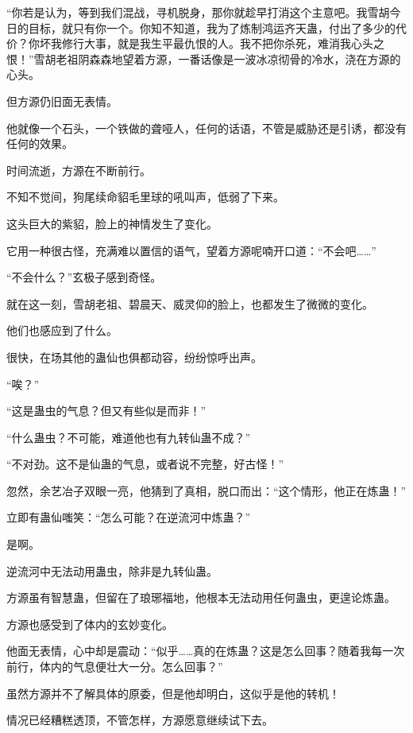 
\begin{this_body}

“你若是认为，等到我们混战，寻机脱身，那你就趁早打消这个主意吧。我雪胡今日的目标，就只有你一个。你知不知道，我为了炼制鸿运齐天蛊，付出了多少的代价？你坏我修行大事，就是我生平最仇恨的人。我不把你杀死，难消我心头之恨！”雪胡老祖阴森森地望着方源，一番话像是一波冰凉彻骨的冷水，浇在方源的心头。

但方源仍旧面无表情。

他就像一个石头，一个铁做的聋哑人，任何的话语，不管是威胁还是引诱，都没有任何的效果。

时间流逝，方源在不断前行。

不知不觉间，狗尾续命貂毛里球的吼叫声，低弱了下来。

这头巨大的紫貂，脸上的神情发生了变化。

它用一种很古怪，充满难以置信的语气，望着方源呢喃开口道：“不会吧……”

“不会什么？”玄极子感到奇怪。

就在这一刻，雪胡老祖、碧晨天、威灵仰的脸上，也都发生了微微的变化。

他们也感应到了什么。

很快，在场其他的蛊仙也俱都动容，纷纷惊呼出声。

“唉？”

“这是蛊虫的气息？但又有些似是而非！”

“什么蛊虫？不可能，难道他也有九转仙蛊不成？”

“不对劲。这不是仙蛊的气息，或者说不完整，好古怪！”

忽然，余艺冶子双眼一亮，他猜到了真相，脱口而出：“这个情形，他正在炼蛊！”

立即有蛊仙嗤笑：“怎么可能？在逆流河中炼蛊？”

是啊。

逆流河中无法动用蛊虫，除非是九转仙蛊。

方源虽有智慧蛊，但留在了琅琊福地，他根本无法动用任何蛊虫，更遑论炼蛊。

方源也感受到了体内的玄妙变化。

他面无表情，心中却是震动：“似乎……真的在炼蛊？这是怎么回事？随着我每一次前行，体内的气息便壮大一分。怎么回事？”

虽然方源并不了解具体的原委，但是他却明白，这似乎是他的转机！

情况已经糟糕透顶，不管怎样，方源愿意继续试下去。


\end{this_body}

